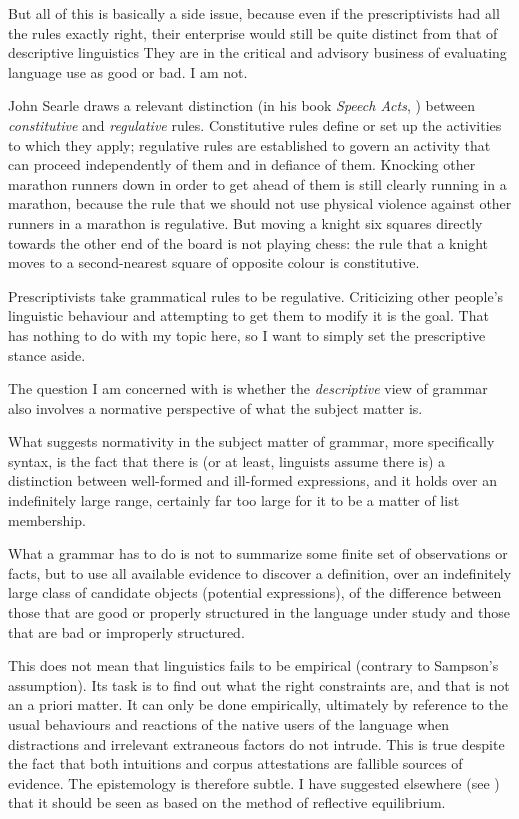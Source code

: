 \documentclass[output=paper]{langscibook}
\begin{document}
But all of this is basically a side issue, because even if the prescriptivists had all the rules exactly right, their enterprise would still be quite distinct from that of descriptive linguistics They are in the critical and advisory business of evaluating language use as good or bad. I am not.

John Searle draws a relevant distinction (in his book \textit{Speech Acts}, \citeyear{Searle69}) between \emph{constitutive} and \emph{regulative} rules.  Constitutive rules define or set up the activities to which they apply; regulative rules are established to govern an activity that can proceed independently of them and in defiance of them.  Knocking other marathon runners down in order to get ahead of them is still clearly running in a marathon, because the rule that we should not use physical violence against other runners in a marathon is regulative. But moving a knight six squares directly towards the other end of the board is not playing chess: the rule that a knight moves to a second-nearest square of opposite colour is constitutive.

Prescriptivists take grammatical rules to be regulative. Criticizing other people's linguistic behaviour and attempting to get them to modify it is the goal.  That has nothing to do with my topic here, so I want to simply set the prescriptive stance aside.

The question I am concerned with is whether the \emph{descriptive} view of grammar also involves a normative perspective of what the subject matter is.

What suggests normativity in the subject matter of grammar, more specifically syntax, is the fact that there is (or at least, linguists assume there is) a distinction between well-formed and ill-formed expressions, and it holds over an indefinitely large range, certainly far too large for it to be a matter of list membership.

What a grammar has to do is not to summarize some finite set of observations or facts, but to use all available evidence to discover a definition, over an indefinitely large class of candidate objects (potential expressions), of the difference between those that are good or properly structured in the language under study and those that are bad or improperly structured.

This does not mean that linguistics fails to be empirical (contrary to Sampson's assumption). Its task is to find out what the right constraints are, and that is not an a priori matter. It can only be done empirically, ultimately by reference to the usual behaviours and reactions of the native users of the language when distractions and irrelevant extraneous factors do not intrude. This is true despite the fact that both intuitions and corpus attestations are fallible sources of evidence. The epistemology is therefore subtle. I have suggested elsewhere (see \citealt{Pullum17}) that it should be seen as based on the method of reflective equilibrium.
\end{document}
